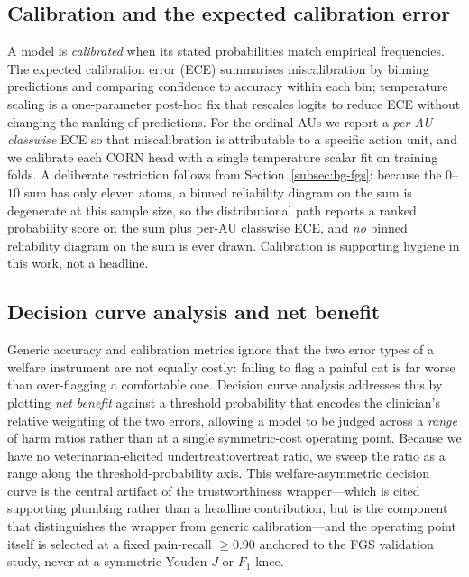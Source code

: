 \subsection{Calibration and the expected calibration error}
\label{subsec:bg-calibration}

A model is \emph{calibrated} when its stated probabilities match empirical
frequencies. The expected calibration error (ECE) summarises miscalibration by
binning predictions and comparing confidence to accuracy within each bin;
temperature scaling \cite{guo2017calibration} is a one-parameter post-hoc fix
that rescales logits to reduce ECE without changing the ranking of predictions.
For the ordinal AUs we report a \emph{per-AU classwise} ECE so that
miscalibration is attributable to a specific action unit, and we calibrate each
CORN head with a single temperature scalar fit on training folds. A deliberate
restriction follows from Section~\ref{subsec:bg-fgs}: because the $0$--$10$ sum
has only eleven atoms, a binned reliability diagram on the sum is degenerate at
this sample size, so the distributional path reports a ranked probability score
on the sum plus per-AU classwise ECE, and \emph{no} binned reliability diagram
on the sum is ever drawn. Calibration is supporting hygiene in this work, not a
headline.

\subsection{Decision curve analysis and net benefit}
\label{subsec:bg-dca}

Generic accuracy and calibration metrics ignore that the two error types of a
welfare instrument are not equally costly: failing to flag a painful cat is far
worse than over-flagging a comfortable one. Decision curve analysis
\cite{vickers2006dca} addresses this by plotting \emph{net benefit} against a
threshold probability that encodes the clinician's relative weighting of the two
errors, allowing a model to be judged across a \emph{range} of harm ratios
rather than at a single symmetric-cost operating point. Because we have no
veterinarian-elicited undertreat:overtreat ratio, we sweep the ratio as a range
along the threshold-probability axis. This welfare-asymmetric decision curve is
the central artifact of the trustworthiness wrapper---which is cited supporting
plumbing rather than a headline contribution, but is the component that
distinguishes the wrapper from generic calibration---and the
operating point itself is selected at a fixed pain-recall $\geq 0.90$ anchored
to the FGS validation study, never at a symmetric Youden-$J$ or $F_1$ knee.

